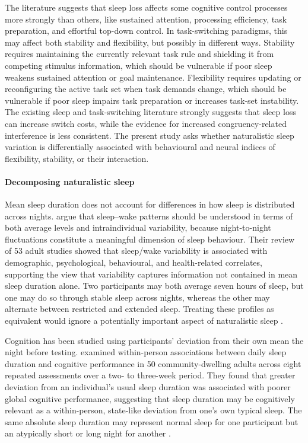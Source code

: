 \documentclass[12pt,a4paper]{report}
\begin{document}
The literature suggests that sleep loss affects some cognitive control processes more strongly than others, like sustained attention, processing efficiency, task preparation, and effortful top-down control. In task-switching paradigms, this may affect both stability and flexibility, but possibly in different ways. Stability requires maintaining the currently relevant task rule and shielding it from competing stimulus information, which should be vulnerable if poor sleep weakens sustained attention or goal maintenance. Flexibility requires updating or reconfiguring the active task set when task demands change, which should be vulnerable if poor sleep impairs task preparation or increases task-set instability. The existing sleep and task-switching literature strongly suggests that sleep loss can increase switch costs, while the evidence for increased congruency-related interference is less consistent. The present study asks whether naturalistic sleep variation is differentially associated with behavioural and neural indices of flexibility, stability, or their interaction.

\paragraph{Decomposing naturalistic sleep} Mean sleep duration does not account for differences in how sleep is distributed across nights. \textcite{bei2016sleepvariability} argue that sleep--wake patterns should be understood in terms of both average levels and intraindividual variability, because night-to-night fluctuations constitute a meaningful dimension of sleep behaviour. Their review of 53 adult studies showed that sleep/wake variability is associated with demographic, psychological, behavioural, and health-related correlates, supporting the view that variability captures information not contained in mean sleep duration alone. Two participants may both average seven hours of sleep, but one may do so through stable sleep across nights, whereas the other may alternate between restricted and extended sleep. Treating these profiles as equivalent would ignore a potentially important aspect of naturalistic sleep \parencite{bei2016sleepvariability}.

Cognition has been studied using participants’ deviation from their own mean the night before testing. \textcite{gamaldo2010sleepcognition} examined within-person associations between daily sleep duration and cognitive performance in 50 community-dwelling adults across eight repeated assessments over a two- to three-week period. They found that greater deviation from an individual’s usual sleep duration was associated with poorer global cognitive performance, suggesting that sleep duration may be cognitively relevant as a within-person, state-like deviation from one’s own typical sleep. The same absolute sleep duration may represent normal sleep for one participant but an atypically short or long night for another \parencite{gamaldo2010sleepcognition}.
\end{document}
